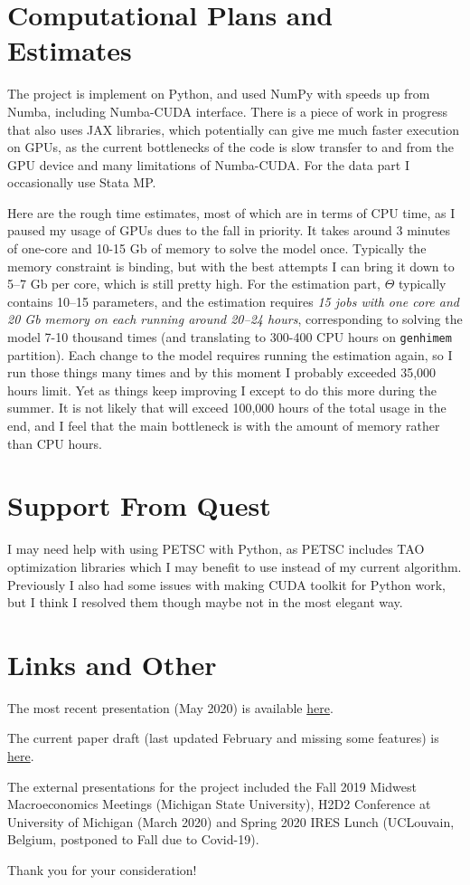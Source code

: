 \documentclass[11pt,letter]{article}
\begin{document}
\section{Computational Plans and Estimates}

The project is implement on Python, and used NumPy with speeds up from Numba, including Numba-CUDA interface. There is a piece of work in progress that also uses JAX libraries, which potentially can give me much faster execution on GPUs, as the current bottlenecks of the code is slow transfer to and from the GPU device and many limitations of Numba-CUDA. For the data part I occasionally use Stata MP.

Here are the rough time estimates, most of which are in terms of CPU time, as I paused my usage of GPUs dues to the fall in priority. It takes around 3 minutes of one-core and 10-15 Gb of memory to solve the model once. Typically the memory constraint is binding, but with the best attempts I can bring it down to 5--7 Gb per core, which is still pretty high. For the estimation part, $\Theta$ typically contains 10--15 parameters, and the estimation requires \textit{15 jobs with one core and 20 Gb memory on each running around 20--24 hours}, corresponding to solving the model 7-10 thousand times (and translating to 300-400 CPU hours on \verb'genhimem' partition). Each change to the model requires running the estimation again, so I run those things many times and by this moment I probably exceeded 35{,}000 hours limit. Yet as things keep improving I except to do this more during the summer. It is not likely that will exceed 100{,}000 hours of the total usage in the end, and I feel that the main bottleneck is with the amount of memory rather than CPU hours.

\section{Support From Quest}
I may need help with using PETSC with Python, as PETSC includes TAO optimization libraries which I may benefit to use instead of my current algorithm. Previously I also had some issues with making CUDA toolkit for Python work, but I think I resolved them though maybe not in the most elegant way.

\section{Links and Other}

The most recent presentation (May 2020) is available \href{https://drive.google.com/file/d/18xt01V2PYm8XG87fu-pRWxwXoRtPYRHG/view?usp=sharing}{here}.

The current paper draft (last updated February and missing some features) is \href{https://drive.google.com/file/d/1BF--Pq8fCSGkPl8CS0L89G-tQeybVNMH/view?usp=sharing}{here}.

The external presentations for the project included the Fall 2019 Midwest Macroeconomics Meetings (Michigan State University), H2D2 Conference at University of Michigan (March 2020) and Spring 2020 IRES Lunch (UCLouvain, Belgium, postponed to Fall due to Covid-19).

Thank you for your consideration!


\end{document}
